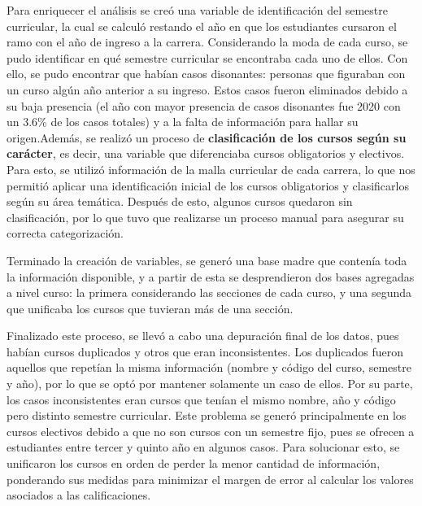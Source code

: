 \documentclass[
  spanish,
  a4paper,
  oneside]{scrbook}
\begin{document}
Para enriquecer el análisis se creó una variable de identificación del
semestre curricular, la cual se calculó restando el año en que los
estudiantes cursaron el ramo con el año de ingreso a la carrera.
Considerando la moda de cada curso, se pudo identificar en qué semestre
curricular se encontraba cada uno de ellos. Con ello, se pudo encontrar
que habían casos disonantes: personas que figuraban con un curso algún
año anterior a su ingreso. Estos casos fueron eliminados debido a su
baja presencia (el año con mayor presencia de casos disonantes fue 2020
con un 3.6\% de los casos totales) y a la falta de información para
hallar su origen.Además, se realizó un proceso de \textbf{clasificación
de los cursos según su carácter}, es decir, una variable que
diferenciaba cursos obligatorios y electivos. Para esto, se utilizó
información de la malla curricular de cada carrera, lo que nos permitió
aplicar una identificación inicial de los cursos obligatorios y
clasificarlos según su área temática. Después de esto, algunos cursos
quedaron sin clasificación, por lo que tuvo que realizarse un proceso
manual para asegurar su correcta categorización.

Terminado la creación de variables, se generó una base madre que
contenía toda la información disponible, y a partir de esta se
desprendieron dos bases agregadas a nivel curso: la primera considerando
las secciones de cada curso, y una segunda que unificaba los cursos que
tuvieran más de una sección.

Finalizado este proceso, se llevó a cabo una depuración final de los
datos, pues habían cursos duplicados y otros que eran inconsistentes.
Los duplicados fueron aquellos que repetían la misma información (nombre
y código del curso, semestre y año), por lo que se optó por mantener
solamente un caso de ellos. Por su parte, los casos inconsistentes eran
cursos que tenían el mismo nombre, año y código pero distinto semestre
curricular. Este problema se generó principalmente en los cursos
electivos debido a que no son cursos con un semestre fijo, pues se
ofrecen a estudiantes entre tercer y quinto año en algunos casos. Para
solucionar esto, se unificaron los cursos en orden de perder la menor
cantidad de información, ponderando sus medidas para minimizar el margen
de error al calcular los valores asociados a las calificaciones.
\end{document}

